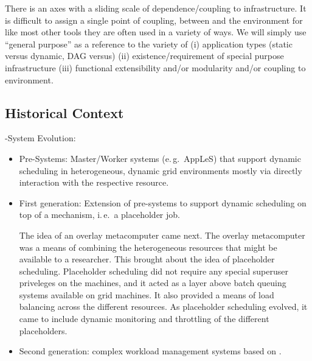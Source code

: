 \documentclass{sig-alternate}
\begin{document}


There is an axes with a sliding scale of dependence/coupling to
infrastructure.  It is difficult to assign a single point of coupling,
between \pilotjobs and the environment for like most other tools they
are often used in a variety of ways.  We will simply use ``general
purpose'' as a reference to the variety of (i) application types
(static versus dynamic, DAG versus) (ii) existence/requirement of
special purpose infrastructure (iii) functional extensibility and/or
modularity and/or coupling to environment.

\subsection{Historical Context}


\pilotjob-System Evolution:
\begin{itemize}
    \item Pre-\pilotjob Systems: Master/Worker systems (e.\,g.\ AppLeS) that 
    support dynamic scheduling in heterogeneous, dynamic grid environments 
    mostly via directly interaction with the respective resource.
    \item First generation: Extension of pre-\pilot systems to support dynamic 
    scheduling on top of a \pilot mechanism, i.\,e.\ a placeholder job.
	
The idea of an overlay metacomputer came next. The overlay metacomputer was a means of combining the heterogeneous resources that might be available to a researcher. This brought about the idea of placeholder scheduling. Placeholder scheduling did not require any special superuser priveleges on the machines, and it acted as a layer above batch queuing systems available on grid machines. It also provided a means of load balancing across the different resources. As placeholder scheduling evolved, it came to include dynamic monitoring and throttling of the different placeholders.


    \item Second generation: complex workload management systems based on \pilots.
\end{itemize}
\end{document}
